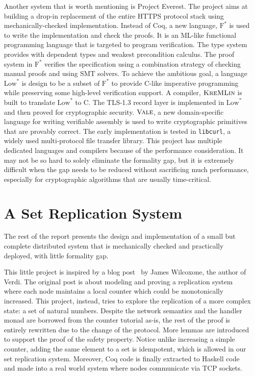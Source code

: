 \documentclass[twocolumn]{article}
\begin{document}
Another system that is worth mentioning is Project Everest. The project aims at
building a drop-in replacement of the entire HTTPS protocol stack using
mechanically-checked implementation. Instead of Coq, a new language,
$\textrm{F}^{*}$ is used to write the implementation and check the proofs. It
is an ML-like functional programming language that is targeted to program
verification. The type system provides with dependent types and weakest
precondition calculus.  The proof system in $\textrm{F}^{*}$ verifies the
specification using a combination strategy of checking manual proofs and using
SMT solvers.  To achieve the ambitious goal, a language $\textrm{Low}^{*}$ is
design to be a subset of $\textrm{F}^{*}$ to provide C-like imperative
programming while preserving some high-level verification support. A compiler,
$\textsc{KreMLin}$ is built to translate $\textrm{Low}^{*}$ to C. The TLS-1.3
record layer is implemented in $\textrm{Low}^{*}$ and then proved for
cryptographic security.  $\textsc{Vale}$, a new domain-specific language for
writing verifiable assembly is used to write cryptographic primitives that are
provably correct. The early implementation is tested in \texttt{libcurl}, a
widely used multi-protocol file transfer library. This project has multiple
dedicated languages and compilers because of the performance consideration. It
may not be so hard to solely eliminate the formality gap, but it is extremely
difficult when the gap needs to be reduced without sacrificing much performance,
especially for cryptographic algorithms that are usually time-critical.
\section{A Set Replication System}
The rest of the report presents the design and implementation of a small but
complete distributed system that is mechanically checked and practically
deployed, with little formality gap.

This little project is inspired by a blog post~\cite{wilcoxcounter} by James Wilcoxone,
the author of Verdi. The original post is about modeling and proving a
replication system where each node maintains a local counter which could be
monotonically increased. This project, instead, tries to explore the
replication of a more complex state: a set of natural numbers. Despite the
network semantics and the handler monad are borrowed from the counter tutorial
as-is, the rest of the proof is entirely rewritten due to the change of the
protocol. More lemmas are introduced to support the proof of the safety
property. Notice unlike increasing a simple counter, adding the same element to
a set is idempotent, which is allowed in our set replication system.  Moreover,
Coq code is finally extracted to Haskell code and made into a real world system where nodes
communicate via TCP sockets.
\end{document}
